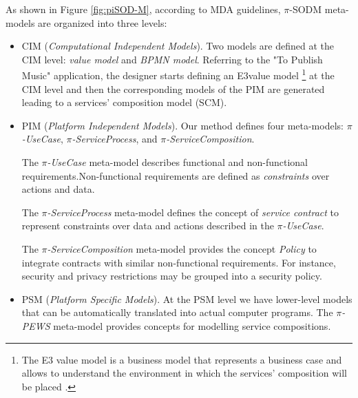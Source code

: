As shown in Figure \ref{fig:piSOD-M}, according to MDA guidelines, $\pi$-SODM meta-models are organized into three levels: 
\begin{itemize}
\item CIM (\textit{Computational Independent Models}). Two models are defined at the CIM level: \textit{value model}
and \textit{BPMN model}. Referring to the "To Publish Music" application,  the designer starts defining an E3value model \footnote{The E3 value model is a business model that represents a business case %
and allows  to understand the environment in which the services' composition will be placed \cite{e3value}.}  at the CIM level and then the corresponding models of the PIM are generated leading to a services' composition model (SCM).

 \item PIM (\textit{Platform Independent Models}). Our method defines four meta-models: \textit{$\pi$-UseCase}, \textit{$\pi$-ServiceProcess}, and \textit{$\pi$-ServiceCom\-po\-si\-tion}.
 
 The \textit{$\pi$-UseCase} meta-model describes functional and non-functional requirements.Non-functional requirements are defined as \textit{constraints} over actions and data.
 
The \textit{$\pi$-ServiceProcess} meta-model defines the concept of \textit{service contract} to represent constraints over data and actions 
described in the \textit{$\pi$-UseCase}.

The \textit{$\pi$-ServiceComposition} meta-model provides the concept  \textit{Policy}
to integrate contracts with similar non-functional requirements.
For instance, security and privacy restrictions may be grouped into a security policy.
 
  \item PSM (\textit{Platform Specific Models}). At the PSM level we have lower-level models that can be automatically translated into actual computer programs. The \textit{$\pi$-PEWS} meta-model provides concepts for modelling service compositions.

\end{itemize}


